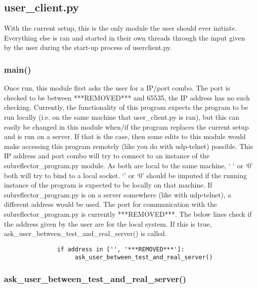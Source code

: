 \documentclass{article}
\begin{document}
 


\subsection{user\_client.py}
 With the current setup, this is the only module the user should ever initiate. Everything else is ran and started in their own threads through the input given by the user during the start-up process of user\-client.py. 
 
 \subsubsection{main()}
 
 Once run, this module first asks the user for a IP/port combo. The port is checked to be between ***REMOVED*** and 65535, the IP address has no such checking. Currently, the functionality of this program expects the program to be run locally (i.e. on the same machine that user\_client.py is ran), but this can easily be changed in this module when/if the program replaces the current setup and is run on a server. If that is the case, then some edits to this module would make accessing this program remotely (like you do with udp-telnet) possible. This IP address and port combo will try to connect to an instance of the subreflector\_program.py module. As both are local to the same machine, ` ` or `0' both will try to bind to a local socket. `' or `0' should be imputed if the running instance of the program is expected to be locally on that machine. If subreflector\_program.py is on a server somewhere (like with udp-telnet), a different address would be used. The port for communication with the subreflector\_program.py is currently ***REMOVED***. The below lines check if the address given by the user are for the local system. If this is true, ask\_user\_between\_test\_and\_real\_server() is called. 

    \begin{lstlisting}
               if address in ['', '***REMOVED***']:
                    ask_user_between_test_and_real_server()
    \end{lstlisting}

\subsubsection{ask\_user\_between\_test\_and\_real\_server()}
\end{document}
